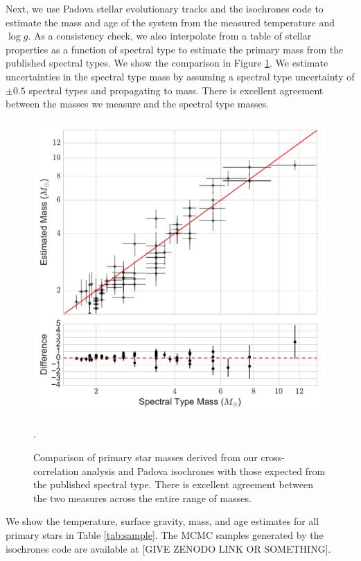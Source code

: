 \documentclass{emulateapj}
\begin{document}
Next, we use Padova stellar evolutionary tracks \citep{Bressan2012} and the isochrones code \citep{isochrones_code} to estimate the mass and age of the system from the measured temperature and $\log{g}$. As a consistency check, we also interpolate from a table of stellar properties as a function of spectral type \citep{Pecaut2013} to estimate the primary mass from the published spectral types. We show the comparison in Figure \ref{fig:prim_mass}. We estimate uncertainties in the spectral type mass by assuming a spectral type uncertainty of $\pm 0.5$ spectral types and propagating to mass. There is excellent agreement between the masses we measure and the spectral type masses.

\begin{figure}
\includegraphics[width=\columnwidth]{PrimaryMassEstimates_log.pdf}
\caption{Comparison of primary star masses derived from our cross-correlation analysis and Padova isochrones \citep{Bressan2012} with those expected from the published spectral type. There is excellent agreement between the two measures across the entire range of masses.}
\label{fig:prim_mass}.
\end{figure}

We show the temperature, surface gravity, mass, and age estimates for all primary stars in Table \ref{tab:sample}. The MCMC samples generated by the isochrones code are available at [GIVE ZENODO LINK OR SOMETHING].
\end{document}
